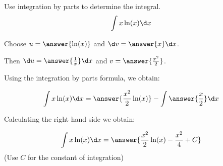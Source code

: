 \documentclass{ximera}
\author{Jason Miller}
\begin{document}
\begin{exercise}
Use integration by parts to determine the integral.
\[
\int x \ln(x) \d x 
\]


Choose $u=\answer{ \ln(x) }$ and $\d v=\answer{x }\d x$. 

Then $\d u= \answer{ \frac{1}{x} } \d x$ and $v= \answer{\frac{x^{2}}{2}}$.

Using the integration by parts formula, we obtain:

\[
\int x \ln(x) \d x= \answer{\frac{x^{2}}{2} \ln(x)} - \int \answer{ \frac{x}{2}  } \d x
\]

Calculating the right hand side we obtain:

\[
\int x \ln(x) \d x= \answer{\frac{x^{2}}{2} \ln(x) -\frac{ x^{2}  }{4}  + C}
\]
(Use $C$ for the constant of integration)

\end{exercise}
\end{document}
